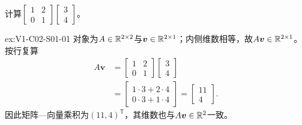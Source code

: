 \begin{SLChapterExercisePairSection}

\begin{exercise}[矩阵乘法]\label{ex:V1-C02-S01-01}
计算$\begin{bmatrix}1&2\\0&1\end{bmatrix}\begin{bmatrix}3\\4\end{bmatrix}$。
\end{exercise}
\label{sol:V1-C02-S01-01}
\begin{chapterexercisesolution}{ex:V1-C02-S01-01}
对象为$A\in\mathbb{R}^{2\times2}$与$\boldsymbol v\in\mathbb{R}^{2\times1}$；内侧维数相等，故$A\boldsymbol v\in\mathbb{R}^{2\times1}$。按行复算
\[
\begin{aligned}
A\boldsymbol v
&=\begin{bmatrix}1&2\\0&1\end{bmatrix}
  \begin{bmatrix}3\\4\end{bmatrix}\\
&=\begin{bmatrix}1\cdot3+2\cdot4\\0\cdot3+1\cdot4\end{bmatrix}
=\begin{bmatrix}11\\4\end{bmatrix}.
\end{aligned}
\]
因此矩阵—向量乘积为$(11,4)^{\mathsf T}$，其维数也与$A\boldsymbol v\in\mathbb{R}^2$一致。
\end{chapterexercisesolution}


\end{SLChapterExercisePairSection}
